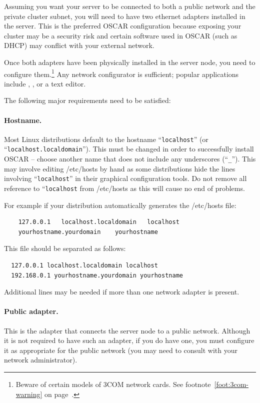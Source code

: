Assuming you want your server to be connected to both a public
network and the private cluster subnet, you will need to have two
ethernet adapters installed in the server. This is the preferred OSCAR
configuration because exposing your cluster may be a security
risk and certain software used in OSCAR (such as DHCP) may conflict with
your external network.

Once both adapters have been physically installed in the server node,
you need to configure them.\footnote{Beware of certain models of 3COM
  network cards.  See footnote~\ref{foot:3com-warning} on
  page~\pageref{foot:3com-warning}.}  Any network configurator is
sufficient; popular applications include , , or
a text editor.

The following major requirements need to be satisfied:

\paragraph{Hostname.} Most Linux distributions default to the hostname
``{\tt localhost}'' (or ``{\tt localhost.localdomain}'').  This must
be changed in order to successfully install OSCAR -- choose another
name that does not include any underscores (``{\tt \_}'').  This may
involve editing /etc/hosts by hand as some distributions hide the
lines involving ``{\tt localhost}'' in their graphical configuration
tools.  Do not remove all reference to ``{\tt localhost} from
/etc/hosts as this will cause no end of problems.

For example if your distribution automatically generates the
/etc/hosts file:
  \begin{verbatim}
    127.0.0.1   localhost.localdomain   localhost
    yourhostname.yourdomain    yourhostname
  \end{verbatim}
  This file should be separated as follows:
  \begin{verbatim}
  127.0.0.1 localhost.localdomain localhost
  192.168.0.1 yourhostname.yourdomain yourhostname
  \end{verbatim}
  Additional lines may be needed if more than one network adapter
  is present.

\paragraph{Public adapter.}  This is the adapter that connects the
server node to a public network.  Although it is not required to have
such an adapter, if you do have one, you must configure it as
appropriate for the public network (you may need to consult with your
network administrator).

